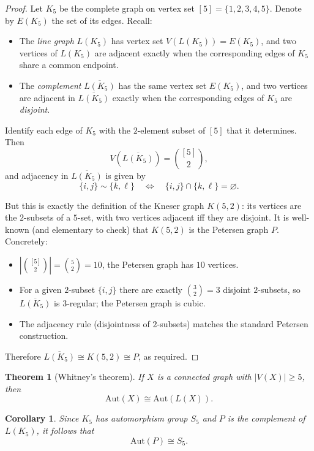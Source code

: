 \documentclass[12pt,a4paper,openany]{book}
\newtheorem{theorem}{Theorem}[section]
\newtheorem{corollary}{Corollary}[section]
\begin{document}
\begin{proof}
Let $K_5$ be the complete graph on vertex set $[5]=\{1,2,3,4,5\}$.  Denote by $E(K_5)$ the set of its edges.  Recall:
\begin{itemize}
  \item The \emph{line graph} $L(K_5)$ has vertex set $V(L(K_5))=E(K_5)$, and two vertices of $L(K_5)$ are adjacent exactly when the corresponding edges of $K_5$ share a common endpoint.
  \item The \emph{complement} $\overline{L(K_5)}$ has the same vertex set $E(K_5)$, and two vertices are adjacent in $\overline{L(K_5)}$ exactly when the corresponding edges of $K_5$ are \emph{disjoint}.
\end{itemize}

Identify each edge of $K_5$ with the $2$-element subset of $[5]$ that it determines. Then
\[
V(\overline{L(K_5)})=\binom{[5]}{2},
\]
and adjacency in $\overline{L(K_5)}$ is given by
\[
\{i,j\}\sim\{k,\ell\}\quad\Longleftrightarrow\quad \{i,j\}\cap\{k,\ell\}=\varnothing.
\]

But this is exactly the definition of the Kneser graph $K(5,2)$: its vertices are the $2$-subsets of a $5$-set, with two vertices adjacent iff they are disjoint. It is well-known (and elementary to check) that $K(5,2)$ is the Petersen graph $P$. Concretely:
\begin{itemize}
  \item $|\binom{[5]}{2}|=\binom{5}{2}=10$, the Petersen graph has $10$ vertices.
  \item For a given $2$-subset $\{i,j\}$ there are exactly $\binom{3}{2}=3$ disjoint $2$-subsets, so $\overline{L(K_5)}$ is $3$-regular; the Petersen graph is cubic.
  \item The adjacency rule (disjointness of $2$-subsets) matches the standard Petersen construction.
\end{itemize}

Therefore $\overline{L(K_5)}\cong K(5,2)\cong P$, as required.
\end{proof}



\begin{theorem}[Whitney’s theorem]
If \(X\) is a connected graph with \(|V(X)|\geq 5\), then
\[
\mathrm{Aut}(X) \cong \mathrm{Aut}(L(X)).
\]
\end{theorem}

\begin{corollary}
Since \(K_5\) has automorphism group \(S_5\) and \(P\) is the complement of \(L(K_5)\),
it follows that
\[
\mathrm{Aut}(P) \cong S_5.
\]
\end{corollary}
\end{document}
